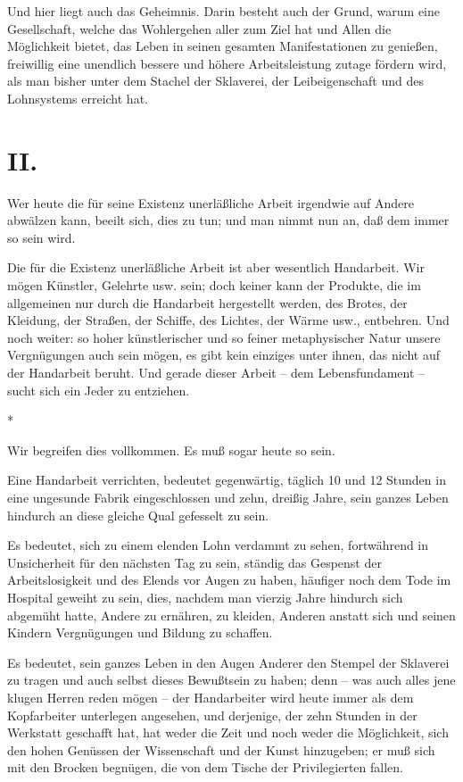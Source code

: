 \documentclass{scrbook}
\begin{document}
Und hier liegt auch das Geheimnis. Darin besteht auch der Grund, warum eine Gesellschaft, welche das Wohlergehen aller zum Ziel hat und Allen die Möglichkeit bietet, das Leben in seinen gesamten Manifestationen zu genießen, freiwillig eine unendlich bessere und höhere Arbeitsleistung zutage fördern wird, als man bisher unter dem Stachel der Sklaverei, der Leibeigenschaft und des Lohnsystems erreicht hat.

\section*{II.}

Wer heute die für seine Existenz unerläßliche Arbeit irgendwie auf Andere abwälzen kann, beeilt sich, dies zu tun; und man nimmt nun an, daß dem immer so sein wird.

Die für die Existenz unerläßliche Arbeit ist aber wesentlich Handarbeit. Wir mögen Künstler, Gelehrte usw. sein; doch keiner kann der Produkte, die im allgemeinen nur durch die Handarbeit hergestellt werden, des Brotes, der Kleidung, der Straßen, der Schiffe, des Lichtes, der Wärme usw., entbehren. Und noch weiter: so hoher künstlerischer und so feiner metaphysischer Natur unsere Vergnügungen auch sein mögen, es gibt kein einziges unter ihnen, das nicht auf der Handarbeit beruht. Und gerade dieser Arbeit – dem Lebensfundament – sucht sich ein Jeder zu entziehen.

\begin{center}*\end{center}

Wir begreifen dies vollkommen. Es muß sogar heute so sein.

Eine Handarbeit verrichten, bedeutet gegenwärtig, täglich 10 und 12 Stunden in eine ungesunde Fabrik eingeschlossen und zehn, dreißig Jahre, sein ganzes Leben hindurch an diese gleiche Qual gefesselt zu sein.

Es bedeutet, sich zu einem elenden Lohn verdammt zu sehen, fortwährend in Unsicherheit für den nächsten Tag zu sein, ständig das Gespenst der Arbeitslosigkeit und des Elends vor Augen zu haben, häufiger noch dem Tode im Hospital geweiht zu sein, dies, nachdem man vierzig Jahre hindurch sich abgemüht hatte, Andere zu ernähren, zu kleiden, Anderen anstatt sich und seinen Kindern Vergnügungen und Bildung zu schaffen.

Es bedeutet, sein ganzes Leben in den Augen Anderer den Stempel der Sklaverei zu tragen und auch selbst dieses Bewußtsein zu haben; denn – was auch alles jene klugen Herren reden mögen – der Handarbeiter wird heute immer als dem Kopfarbeiter unterlegen angesehen, und derjenige, der zehn Stunden in der Werkstatt geschafft hat, hat weder die Zeit und noch weder die Möglichkeit, sich den hohen Genüssen der Wissenschaft und der Kunst hinzugeben; er muß sich mit den Brocken begnügen, die von dem Tische der Privilegierten fallen.
\end{document}
